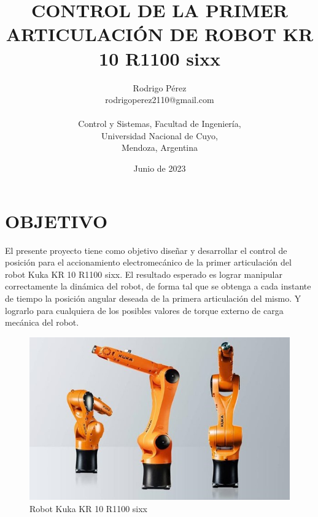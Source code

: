 \documentclass{article}
\title{\textbf{CONTROL DE LA PRIMER ARTICULACIÓN DE ROBOT KR 10 R1100 sixx}}
\author{Rodrigo Pérez \\ rodrigoperez2110@gmail.com \\ \\ Control y Sistemas, Facultad de Ingeniería, \\ Universidad Nacional de Cuyo, \\ Mendoza, Argentina}
\date{Junio de 2023}
\begin{document}
\renewcommand{\tablename}{Tabla}

\maketitle


\section{OBJETIVO}
\label{sec:OBJETIVO}


El presente proyecto tiene como objetivo diseñar y desarrollar el control de posición para el accionamiento electromecánico de la primer articulación del robot Kuka KR 10 R1100 sixx. El resultado esperado es lograr manipular correctamente la dinámica del robot, de forma tal que se obtenga a cada instante de tiempo la posición angular deseada de la primera articulación del mismo. Y lograrlo para cualquiera de los posibles valores de torque externo de carga mecánica del robot.


\begin{figure}[H]
    \centering
    \includegraphics[width=1\textwidth]{3RobotsKuka}
    \caption{Robot Kuka KR 10 R1100 sixx}
    \label{fig:3RobotsKuka}
\end{figure}
\end{document}
